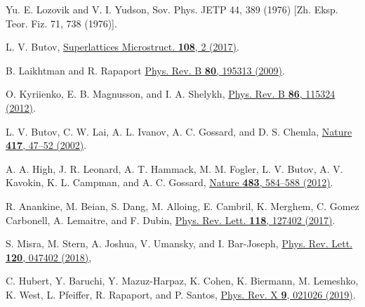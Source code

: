 \documentclass[prb,twocolumn,preprintnumbers,superscriptaddress]{revtex4}
\begin{document}
\begin{thebibliography}{99}

Yu. E. Lozovik and V. I. Yudson, 
Sov. Phys. JETP 44, 389 (1976) [Zh. Eksp. Teor. Fiz. 71,
738 (1976)].

L. V. Butov,
\href{https://www.sciencedirect.com/science/article/abs/pii/S0749603616316561}{Superlattices Microstruct. {\bf 108}, 2 (2017)}.

B. Laikhtman and R. Rapaport
\href{
https://journals.aps.org/prb/abstract/10.1103/PhysRevB.80.195313}{Phys. Rev. B {\bf 80}, 195313 (2009)}.

O. Kyriienko, E. B. Magnusson, and I. A. Shelykh,
\href{https://journals.aps.org/prb/abstract/10.1103/PhysRevB.86.115324}{Phys. Rev. B {\bf 86}, 115324 (2012)}.


L. V. Butov, C. W. Lai, A. L. Ivanov, A. C. Gossard, and D. S. Chemla,
\href{https://www.nature.com/articles/417047a}{Nature {\bf 417}, 47–52 (2002)}.

A. A. High, J. R. Leonard, A. T. Hammack, M. M. Fogler, L. V. Butov, A. V. Kavokin, K. L. Campman, and A. C. Gossard, 
\href{https://www.nature.com/articles/nature00943}{Nature {\bf 483}, 584–588 (2012)}.

R. Anankine, M. Beian, S. Dang, M. Alloing, E. Cambril, K. Merghem, C. Gomez Carbonell, A. Lemaitre, and F. Dubin,
\href{https://journals.aps.org/prl/abstract/10.1103/PhysRevLett.118.127402}{Phys. Rev. Lett. {\bf 118}, 127402 (2017)}.

S. Misra, M. Stern, A. Joshua, V. Umansky, and I. Bar-Joseph,
\href{https://journals.aps.org/prl/abstract/10.1103/PhysRevLett.120.047402}{Phys. Rev. Lett. {\bf 120}, 047402 (2018)},

C. Hubert, Y. Baruchi, Y. Mazuz-Harpaz, K. Cohen, K. Biermann, M. Lemeshko, K. West, L. Pfeiffer, R. Rapaport, and P. Santos,
\href{https://journals.aps.org/prx/abstract/10.1103/PhysRevX.9.021026}{Phys. Rev. X {\bf 9}, 021026 (2019)}.


\end{thebibliography}
\end{document}

